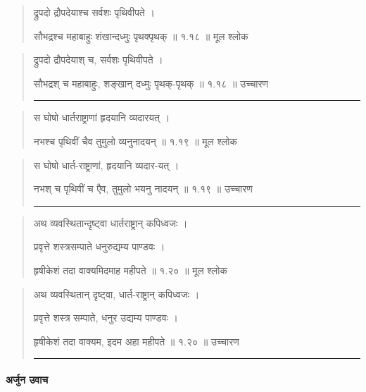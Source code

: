 \begin{quotation} 

द्रुपदो द्रौपदेयाश्च सर्वशः पृथिवीपते  ।  

सौभद्रश्च महाबाहुः शंखान्दध्मुः पृथक्पृथक्‌  ॥ १.१८ ॥  मूल श्लोक
\end{quotation}

\begin{quotation}

द्रुपदो द्रौपदेयाश् च, सर्वशः पृथिवीपते  ।  

सौभद्रश् च महाबाहुः, शङ्खान् दध्मुः पृथक्-पृथक्  ॥ १.१८ ॥  उच्चारण

\noindent\rule{16cm}{0.4pt} 
\end{quotation}


\begin{quotation} 

स घोषो धार्तराष्ट्राणां हृदयानि व्यदारयत्‌  ।  

नभश्च पृथिवीं चैव तुमुलो व्यनुनादयन्‌  ॥ १.१९ ॥  मूल श्लोक
\end{quotation}

\begin{quotation}

स घोषो धार्त-राष्ट्राणां, हृदयानि व्यदार-यत्  ।  

नभश् च पृथिवीं च एैव, तुमुलो भयनु नादयन्  ॥ १.१९ ॥  उच्चारण

\noindent\rule{16cm}{0.4pt} 
\end{quotation}


\begin{quotation} 

अथ व्यवस्थितान्दृष्ट्वा धार्तराष्ट्रान्‌ कपिध्वजः  ।  

प्रवृत्ते शस्त्रसम्पाते धनुरुद्यम्य पाण्डवः  ।  
 
हृषीकेशं तदा वाक्यमिदमाह महीपते   ॥ १.२० ॥  मूल श्लोक
\end{quotation}

\begin{quotation}

अथ व्यवस्थितान् दृष्ट्वा, धार्त-राष्ट्रान् कपिध्वजः ।  

प्रवृत्ते शस्त्र सम्पाते, धनुर उद्यम्य पाण्डवः  ।  

हृषीकेशं तदा वाक्यम,  इदम अहा महीपते  ॥ १.२० ॥  उच्चारण

\noindent\rule{16cm}{0.4pt} 
\end{quotation}

\paragraph{\sanskrit अर्जुन उवाच}

